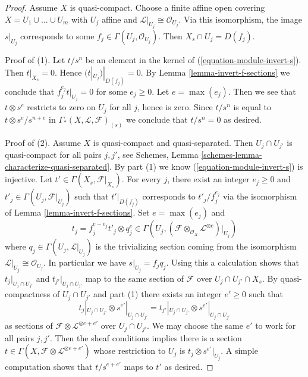 \documentclass{stacks-project}
\theoremstyle{plain}
\theoremstyle{definition}
\theoremstyle{remark}
\numberwithin{equation}{subsection}
\begin{document}
\begin{proof}
Assume $X$ is quasi-compact. Choose a finite affine open covering
$X = U_1 \cup \ldots \cup U_m$ with $U_j$ affine and
$\mathcal{L}|_{U_j} \cong \mathcal{O}_{U_j}$. Via this isomorphism,
the image $s|_{U_j}$ corresponds to some
$f_j \in \Gamma(U_j, \mathcal{O}_{U_j})$. Then
$X_s \cap U_j = D(f_j)$.

\medskip\noindent
Proof of (1). Let $t/s^n$ be an element in the kernel of
(\ref{equation-module-invert-s}). Then $t|_{X_s} = 0$.
Hence $(t|_{U_j})|_{D(f_j)} = 0$. By
Lemma \ref{lemma-invert-f-sections} we conclude that
$f_j^{e_j} t|_{U_j} = 0$ for some
$e_j \geq 0$. Let $e = \max(e_j)$. Then we see that $t \otimes s^e$
restricts to zero on $U_j$ for all $j$, hence is zero. Since $t/s^n$
is equal to $t \otimes s^e/s^{n + e}$ in
$\Gamma_*(X, \mathcal{L}, \mathcal{F})_{(s)}$ we conclude that $t/s^n = 0$
as desired.

\medskip\noindent
Proof of (2). Assume $X$ is quasi-compact and quasi-separated.
Then $U_j \cap U_{j'}$ is quasi-compact for all pairs $j, j'$, see
Schemes, Lemma \ref{schemes-lemma-characterize-quasi-separated}.
By part (1) we know (\ref{equation-module-invert-s}) is injective.
Let $t' \in \Gamma(X_s, \mathcal{F}|_{X_s})$. For every $j$, there exist an
integer $e_j \geq 0$ and $t'_j \in \Gamma(U_j, \mathcal{F}|_{U_j})$ such that
$t'|_{D(f_j)}$ corresponds to $t'_j/f_j^{e_j}$
via the isomorphism of Lemma \ref{lemma-invert-f-sections}.
Set $e = \max(e_j)$ and
$$
t_j = f_j^{e - e_j} t'_j \otimes q_j^e \in
\Gamma(U_j,
(\mathcal{F} \otimes_{\mathcal{O}_X} \mathcal{L}^{\otimes e})|_{U_j})
$$
where $q_j \in \Gamma(U_j, \mathcal{L}|_{U_j})$ is the trivializing
section coming from the isomorphism
$\mathcal{L}|_{U_j} \cong \mathcal{O}_{U_j}$. In particular we have
$s|_{U_j} = f_j q_j$. Using this a calculation shows that
$t_j|_{U_j \cap U_{j'}}$ and $t_{j'}|_{U_j \cap U_{j'}}$
map to the same section of $\mathcal{F}$ over $U_j \cap U_{j'} \cap X_s$.
By quasi-compactness of $U_j \cap U_{j'}$ and part (1) there exists an
integer $e' \geq 0$ such that
$$
t_j|_{U_j \cap U_{j'}} \otimes s^{e'}|_{U_j \cap U_{j'}} =
t_{j'}|_{U_j \cap U_{j'}} \otimes s^{e'}|_{U_j \cap U_{j'}}
$$
as sections of $\mathcal{F} \otimes \mathcal{L}^{\otimes e + e'}$ over
$U_j \cap U_{j'}$. We may choose the same $e'$ to work for all pairs
$j, j'$. Then the sheaf conditions implies there is a section
$t \in \Gamma(X, \mathcal{F} \otimes \mathcal{L}^{\otimes e + e'})$
whose restriction to $U_j$ is $t_j \otimes s^{e'}|_{U_j}$.
A simple computation shows that $t/s^{e + e'}$ maps to $t'$
as desired.
\end{proof}
\end{document}
